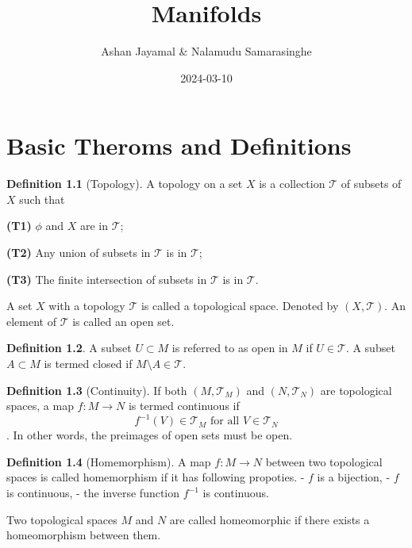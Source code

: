 \documentclass[
]{book}
\title{Manifolds}
\author{Ashan Jayamal \& Nalamudu Samarasinghe}
\date{2024-03-10}
\theoremstyle{definition}
\newtheorem{definition}{Definition}[chapter]
\theoremstyle{definition}
\theoremstyle{definition}
\theoremstyle{definition}
\theoremstyle{remark}
\begin{document}
\maketitle

{
\setcounter{tocdepth}{1}
\tableofcontents
}
\hypertarget{basic-theroms-and-definitions}{%
\chapter{Basic Theroms and Definitions}\label{basic-theroms-and-definitions}}

\begin{definition}[Topology]
\protect\hypertarget{def:Top}{}\label{def:Top}A topology on a set \(X\) is a collection \(\mathcal{T}\) of subsets of \(X\) such that

\textbf{(T1)} \(\phi\) and \(X\) are in \(\mathcal{T}\);

\textbf{(T2)} Any union of subsets in \(\mathcal{T}\) is in \(\mathcal{T}\);

\textbf{(T3)} The finite intersection of subsets in \(\mathcal{T}\) is in \(\mathcal{T}\).
\end{definition}

A set \(X\) with a topology \(\mathcal{T}\) is called a topological space. Denoted by \((X,\mathcal{T})\). An element of \(\mathcal{T}\) is called an open set.

\begin{definition}
\protect\hypertarget{def:unnamed-chunk-1}{}\label{def:unnamed-chunk-1}A subset \(U \subset M\) is referred to as open in \(M\) if \(U \in \mathcal{T}\). A subset \(A \subset M\) is termed closed if \(M \setminus A \in \mathcal{T}\).
\end{definition}

\begin{definition}[Continuity]
\protect\hypertarget{def:unnamed-chunk-2}{}\label{def:unnamed-chunk-2}If both \((M, \mathcal{T}_M)\) and \((N, \mathcal{T}_N)\) are topological spaces, a map \(f : M \rightarrow N\) is termed continuous if \[f^{-1}(V) \in \mathcal{T}_M \text{ for all } V \in \mathcal{T}_N\].
In other words, the preimages of open sets must be open.
\end{definition}

\begin{definition}[Homemorphism]
\protect\hypertarget{def:unnamed-chunk-3}{}\label{def:unnamed-chunk-3}A map \(f : M \rightarrow N\) between two topological spaces is called homemorphism if it has following propoties.
- \(f\) is a bijection,
- \(f\) is continuous,
- the inverse function \(f^{-1}\) is continuous.

Two topological spaces \(M\) and \(N\) are called homeomorphic if there exists a homeomorphism between them.
\end{definition}
\end{document}
